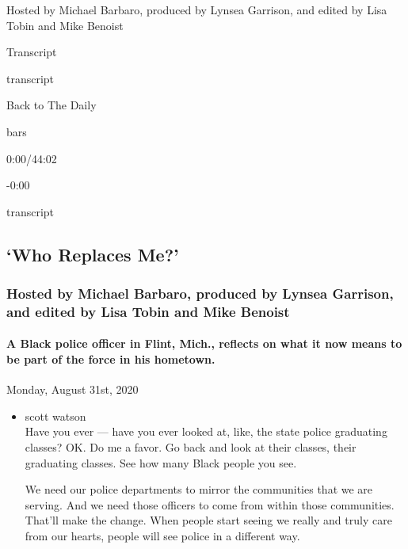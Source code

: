 Hosted by Michael Barbaro, produced by Lynsea Garrison, and edited by
Lisa Tobin and Mike Benoist

Transcript

transcript

Back to The Daily

bars

0:00/44:02

-0:00

transcript

\hypertarget{who-replaces-me-2}{%
\subsection{`Who Replaces Me?'}\label{who-replaces-me-2}}

\hypertarget{hosted-by-michael-barbaro-produced-by-lynsea-garrison-and-edited-by-lisa-tobin-and-mike-benoist-1}{%
\subsubsection{Hosted by Michael Barbaro, produced by Lynsea Garrison,
and edited by Lisa Tobin and Mike
Benoist}\label{hosted-by-michael-barbaro-produced-by-lynsea-garrison-and-edited-by-lisa-tobin-and-mike-benoist-1}}

\hypertarget{a-black-police-officer-in-flint-mich-reflects-on-what-it-now-means-to-be-part-of-the-force-in-his-hometown-2}{%
\paragraph{A Black police officer in Flint, Mich., reflects on what it
now means to be part of the force in his
hometown.}\label{a-black-police-officer-in-flint-mich-reflects-on-what-it-now-means-to-be-part-of-the-force-in-his-hometown-2}}

Monday, August 31st, 2020

\begin{itemize}
\item
  scott watson\\
  Have you ever --- have you ever looked at, like, the state police
  graduating classes? OK. Do me a favor. Go back and look at their
  classes, their graduating classes. See how many Black people you see.

  We need our police departments to mirror the communities that we are
  serving. And we need those officers to come from within those
  communities. That'll make the change. When people start seeing we
  really and truly care from our hearts, people will see police in a
  different way.
\end{itemize}


